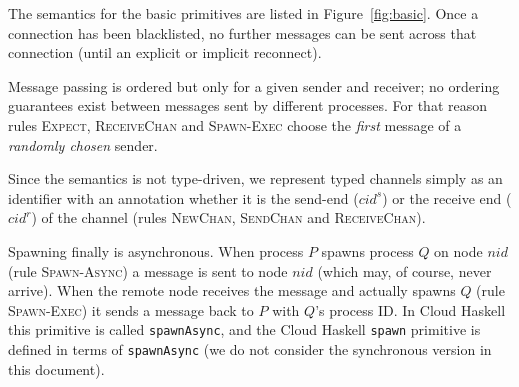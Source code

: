 \documentclass{article}
\newcommand{\sNid}{\ensuremath{\mathit{nid}}}
\newcommand{\sCid}{\ensuremath{\mathit{cid}}}
\begin{document}
The semantics for the basic primitives are listed in Figure~\ref{fig:basic}.
Once a connection has been blacklisted, no further messages can be sent across
that connection (until an explicit or implicit reconnect).

Message passing is ordered but only for a given sender and receiver; no
ordering guarantees exist between messages sent by different processes. For
that reason rules \textsc{Expect}, \textsc{ReceiveChan} and \textsc{Spawn-Exec}
choose the \emph{first} message of a \emph{randomly chosen} sender. 

Since the semantics is not type-driven, we represent typed channels simply as
an identifier with an annotation whether it is the send-end ($\sCid^s$) or the
receive end ($\sCid^r$) of the channel (rules \textsc{NewChan},
\textsc{SendChan} and \textsc{ReceiveChan}).

Spawning finally is asynchronous. When process $P$ spawns process $Q$ on node
$\sNid$ (rule \textsc{Spawn-Async}) a message is sent to node $\sNid$ (which
may, of course, never arrive). When the remote node receives the message and
actually spawns $Q$ (rule \textsc{Spawn-Exec}) it sends a message back to $P$
with $Q$'s process ID. In Cloud Haskell this primitive is called
\texttt{spawnAsync}, and the Cloud Haskell \texttt{spawn} primitive is defined
in terms of \texttt{spawnAsync} (we do not consider the synchronous version in
this document).
\end{document}
